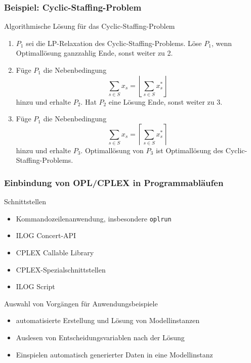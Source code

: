 \begin{frame}
 \frametitle{Beispiel: Cyclic-Staffing-Problem}
 \begin{block}{Algorithmische Lösung für das Cyclic-Staffing-Problem}\footnotesize
  \begin{enumerate}
   \item $P_1$ sei die LP-Relaxation des Cyclic-Staffing-Problems. Löse $P_1$, wenn Optimallösung ganzzahlig Ende, sonst weiter zu 2.
   \item Füge $P_1$ die Nebenbedingung \[\sum_{s\in S}x_s = \left\lfloor\sum_{s\in S}x^*_s\right\rfloor\] hinzu und erhalte $P_2$. Hat $P_2$ eine Lösung Ende, sonst weiter zu 3.
   \item Füge $P_1$ die Nebenbedingung \[\sum_{s\in S}x_s = \left\lceil\sum_{s\in S}x^*_s\right\rceil\] hinzu und erhalte $P_3$. Optimallösung von $P_3$ ist Optimallösung des Cyclic-Staffing-Problems.
  \end{enumerate}
 \end{block}
\end{frame}

\begin{frame}
 \frametitle{Einbindung von OPL/CPLEX in Programmabläufen}
 \footnotesize
 \begin{block}{Schnittstellen}
  \begin{itemize}
    \item Kommandozeilenanwendung, insbesondere \texttt{oplrun}
    \item ILOG Concert-API
    \item CPLEX Callable Library
    \item CPLEX-Spezialschnittstellen
    \item ILOG Script
  \end{itemize}
 \end{block}
 \pause
 \begin{block}{Auswahl von Vorgängen für Anwendungsbeispiele}
  \begin{itemize}
   \item automatisierte Erstellung und Lösung von Modellinstanzen
   \item Auslesen von Entscheidungsvariablen nach der Lösung
   \item Einspielen automatisch generierter Daten in eine Modellinstanz
  \end{itemize}
 \end{block}
\end{frame}

